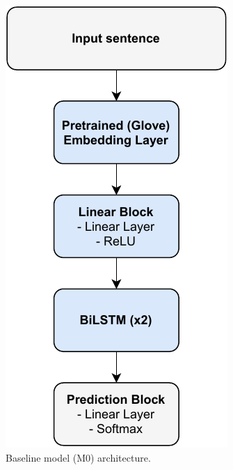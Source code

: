 \documentclass[11pt,a4paper]{article}
\begin{document}
	\begin{figure}[H]
		\centering
		\includegraphics[width=0.7\columnwidth]{M0_diagram.pdf}
		\caption{Baseline model (M0) architecture.}
		\label{fig:M0_architecture}
	\end{figure}
	
\end{document}
